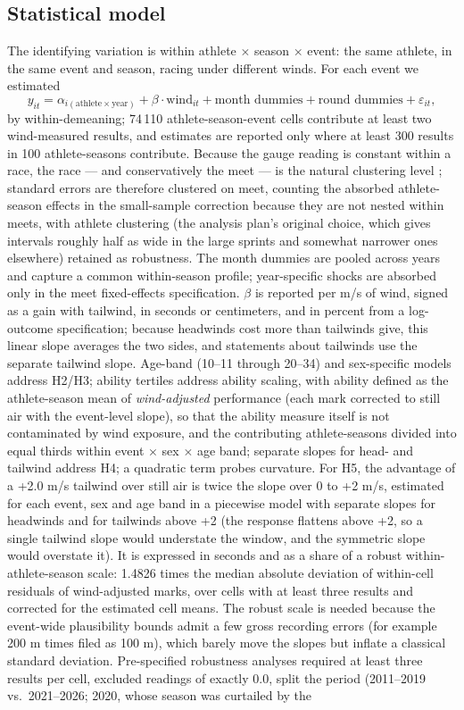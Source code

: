 \documentclass[12pt,a4paper]{article}
\begin{document}
\subsection{Statistical model}

The identifying variation is within athlete $\times$ season $\times$ event: the same athlete, in the same event and season, racing under different winds. For each event we estimated
\[
y_{it} = \alpha_{i(\text{athlete} \times \text{year})} + \beta \cdot \text{wind}_{it} + \text{month dummies} + \text{round dummies} + \varepsilon_{it},
\]
by within-demeaning; 74\,110 athlete-season-event cells contribute at least two wind-measured results, and estimates are reported only where at least 300 results in 100 athlete-seasons contribute. Because the gauge reading is constant within a race, the race --- and conservatively the meet --- is the natural clustering level \citep{moulton1986}; standard errors are therefore clustered on meet, counting the absorbed athlete-season effects in the small-sample correction because they are not nested within meets, with athlete clustering (the analysis plan's original choice, which gives intervals roughly half as wide in the large sprints and somewhat narrower ones elsewhere) retained as robustness. The month dummies are pooled across years and capture a common within-season profile; year-specific shocks are absorbed only in the meet fixed-effects specification. $\beta$ is reported per m/s of wind, signed as a gain with tailwind, in seconds or centimeters, and in percent from a log-outcome specification; because headwinds cost more than tailwinds give, this linear slope averages the two sides, and statements about tailwinds use the separate tailwind slope. Age-band (10--11 through 20--34) and sex-specific models address H2/H3; ability tertiles address ability scaling, with ability defined as the athlete-season mean of \emph{wind-adjusted} performance (each mark corrected to still air with the event-level slope), so that the ability measure itself is not contaminated by wind exposure, and the contributing athlete-seasons divided into equal thirds within event $\times$ sex $\times$ age band; separate slopes for head- and tailwind address H4; a quadratic term probes curvature. For H5, the advantage of a +2.0 m/s tailwind over still air is twice the slope over 0 to +2 m/s, estimated for each event, sex and age band in a piecewise model with separate slopes for headwinds and for tailwinds above +2 (the response flattens above +2, so a single tailwind slope would understate the window, and the symmetric slope would overstate it). It is expressed in seconds and as a share of a robust within-athlete-season scale: 1.4826 times the median absolute deviation of within-cell residuals of wind-adjusted marks, over cells with at least three results and corrected for the estimated cell means. The robust scale is needed because the event-wide plausibility bounds admit a few gross recording errors (for example 200 m times filed as 100 m), which barely move the slopes but inflate a classical standard deviation. Pre-specified robustness analyses required at least three results per cell, excluded readings of exactly 0.0, split the period (2011--2019 vs.\ 2021--2026; 2020, whose season was curtailed by the 
\end{document}
